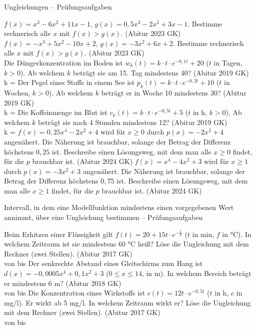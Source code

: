 \begin{aufgabe}{Ungleichungen – Prüfungsaufgaben}
\begin{teile}
\teil $f(x) = x^3 - 6x^2 + 11x - 1$, $g(x) = 0{,}5x^3 - 2x^2 + 3x - 1$. Bestimme rechnerisch alle $x$ mit $f(x) > g(x)$. \hfill (Abitur 2023 GK) \\ \leerfeld
\teil $f(x) = -x^3 + 5x^2 - 10x + 2$, $g(x) = -3x^2 + 6x + 2$. Bestimme rechnerisch alle $x$ mit $f(x) > g(x)$. \hfill (Abitur 2023 GK) \\ \leerfeld
\teil Die Düngerkonzentration im Boden ist $w_k(t) = k \cdot t \cdot e^{-0{,}1t} + 20$ ($t$ in Tagen, $k > 0$). Ab welchem $k$ beträgt sie am 15. Tag mindestens 40? \hfill (Abitur 2019 GK) \\ k = \leerfeld
\teil Der Pegel eines Stoffs in einem See ist $p_k(t) = k \cdot t \cdot e^{-0{,}2t} + 10$ ($t$ in Wochen, $k > 0$). Ab welchem $k$ beträgt er in Woche 10 mindestens 30? \hfill (Abitur 2019 GK) \\ k = \leerfeld
\teil Die Koffeinmenge im Blut ist $c_k(t) = k \cdot t \cdot e^{-0{,}5t} + 5$ ($t$ in h, $k > 0$). Ab welchem $k$ beträgt sie nach 4 Stunden mindestens 12? \hfill (Abitur 2019 GK) \\ k = \leerfeld
\teil $f(x) = 0{,}25x^4 - 2x^2 + 4$ wird für $x \ge 0$ durch $p(x) = -2x^2 + 4$ angenähert. Die Näherung ist brauchbar, solange der Betrag der Differenz höchstens $0{,}25$ ist. Beschreibe einen Lösungsweg, mit dem man alle $x \ge 0$ findet, für die $p$ brauchbar ist. \hfill (Abitur 2024 GK)
\teil $f(x) = x^4 - 4x^2 + 3$ wird für $x \ge 1$ durch $p(x) = -3x^2 + 3$ angenähert. Die Näherung ist brauchbar, solange der Betrag der Differenz höchstens $0{,}75$ ist. Beschreibe einen Lösungsweg, mit dem man alle $x \ge 1$ findet, für die $p$ brauchbar ist. \hfill (Abitur 2024 GK)
\end{teile}
\end{aufgabe}

\begin{aufgabe}{Intervall, in dem eine Modellfunktion mindestens einen vorgegebenen Wert annimmt, über eine Ungleichung bestimmen – Prüfungsaufgaben}
\begin{teile}
\teil Beim Erhitzen einer Flüssigkeit gilt $f(t) = 20 + 15t \cdot e^{-\frac{t}{8}}$ ($t$ in min, $f$ in °C). In welchem Zeitraum ist sie mindestens 60 °C heiß? Löse die Ungleichung mit dem Rechner (zwei Stellen). \hfill (Abitur 2017 GK) \\ von \leerfeld bis \leerfeld[min]
\teil Der senkrechte Abstand eines Gleitschirms zum Hang ist $d(x) = -0{,}0005x^4 + 0{,}1x^2 + 3$ ($0 \le x \le 14$, in m). In welchem Bereich beträgt er mindestens 6 m? \hfill (Abitur 2018 GK) \\ von \leerfeld bis \leerfeld[m]
\teil Die Konzentration eines Wirkstoffs ist $c(t) = 12t \cdot e^{-0{,}5t}$ ($t$ in h, $c$ in mg/l). Er wirkt ab 5 mg/l. In welchem Zeitraum wirkt er? Löse die Ungleichung mit dem Rechner (zwei Stellen). \hfill (Abitur 2017 GK) \\ von \leerfeld bis \leerfeld[h]
\end{teile}
\end{aufgabe}
